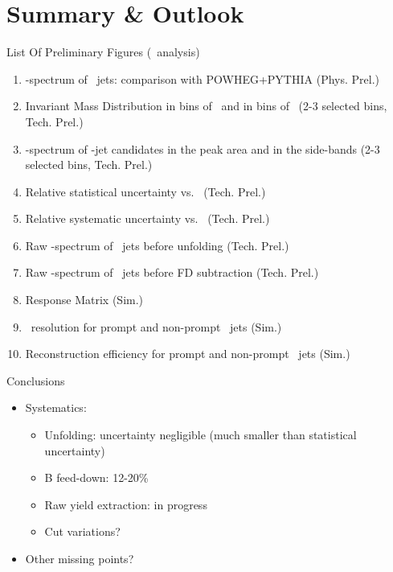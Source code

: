 \documentclass[xcolor={usenames,dvipsnames}]{beamer}
\begin{document}
\section{Summary \& Outlook}

\begin{frame}{List Of Preliminary Figures (\pp\ analysis)}

{\footnotesize
    \begin{enumerate}
        \item \pt-spectrum of \Dzero\ jets: comparison with POWHEG+PYTHIA (Phys. Prel.)
        \item Invariant Mass Distribution in bins of \ptchjet\ and in bins of \ptd\ (2-3 selected bins, Tech. Prel.)
        \item \pt-spectrum of \Dzero-jet candidates in the peak area and in the side-bands (2-3 selected bins, Tech. Prel.)
        \item Relative statistical uncertainty vs. \ptchjet\ (Tech. Prel.)
        \item Relative systematic uncertainty vs. \ptchjet\ (Tech. Prel.)
        \item Raw \pt-spectrum of \Dzero\ jets before unfolding (Tech. Prel.)
        \item Raw \pt-spectrum of \Dzero\ jets before FD subtraction (Tech. Prel.)
        \item Response Matrix (Sim.)
        \item \ptchjet\ resolution for prompt and non-prompt \Dzero\ jets (Sim.)
        \item Reconstruction efficiency for prompt and non-prompt \Dzero\ jets (Sim.)
    \end{enumerate}
    }
\end{frame}

\begin{frame}{Conclusions}
    \begin{itemize}
        \item Systematics:
        \begin{itemize}
            \item Unfolding: uncertainty negligible (much smaller than statistical uncertainty)
            \item B feed-down: 12-20\%
            \item Raw yield extraction: in progress
            \item Cut variations?
        \end{itemize}
        \item Other missing points?
    \end{itemize}
\end{frame}
\end{document}
